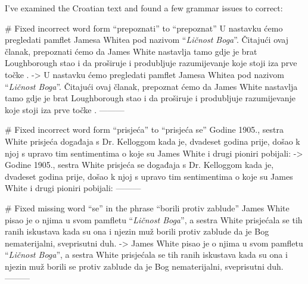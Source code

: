 I've examined the Croatian text and found a few grammar issues to correct:

# Fixed incorrect word form “prepoznati” to “prepoznat”
U nastavku ćemo pregledati pamflet Jamesa Whitea pod nazivom “\textit{Ličnost Boga}”. Čitajući ovaj članak, prepoznati ćemo da James White nastavlja tamo gdje je brat Loughborough stao i da proširuje i produbljuje razumijevanje koje stoji iza prve točke .
->
U nastavku ćemo pregledati pamflet Jamesa Whitea pod nazivom “\textit{Ličnost Boga}”. Čitajući ovaj članak, prepoznat ćemo da James White nastavlja tamo gdje je brat Loughborough stao i da proširuje i produbljuje razumijevanje koje stoji iza prve točke .
---------

# Fixed incorrect word form “prisjeća” to “prisjeća se”
Godine 1905., sestra White prisjeća događaja s Dr. Kelloggom kada je, dvadeset godina prije, došao k njoj s upravo tim sentimentima o  koje su James White i drugi pioniri pobijali:
->
Godine 1905., sestra White prisjeća se događaja s Dr. Kelloggom kada je, dvadeset godina prije, došao k njoj s upravo tim sentimentima o  koje su James White i drugi pioniri pobijali:
---------

# Fixed missing word “se” in the phrase “borili protiv zablude”
James White pisao je o njima u svom pamfletu “\textit{Ličnost Boga}”, a sestra White prisjećala se tih ranih iskustava kada su ona i njezin muž borili protiv zablude da je Bog nematerijalni, sveprisutni duh.
->
James White pisao je o njima u svom pamfletu “\textit{Ličnost Boga}”, a sestra White prisjećala se tih ranih iskustava kada su ona i njezin muž borili se protiv zablude da je Bog nematerijalni, sveprisutni duh.
---------